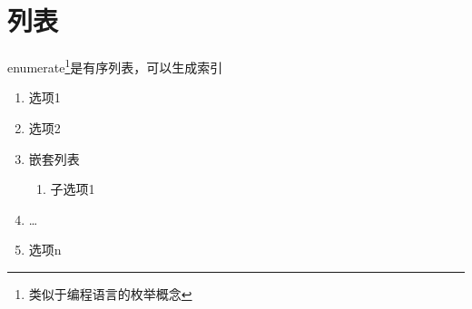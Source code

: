 \section{列表}
enumerate\footnote{类似于编程语言的枚举概念}是有序列表，可以生成索引
\begin{enumerate}
    \item 选项1
    \item 选项2
    \item 嵌套列表
    \begin{enumerate}
        \item 子选项1
    \end{enumerate}
    \item \ldots
    \item 选项n
\end{enumerate}